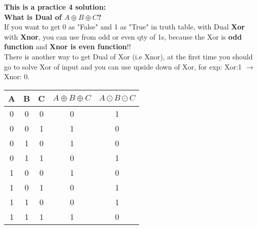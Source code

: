 \documentclass[12pt]{report}
\begin{document}
\LARGE \textbf{This is a practice 4 solution:}\\

\large \textbf{What is Dual of $A \oplus B \oplus C$?}\\

If you want to get 0 as "False" and 1 as "True" in truth table, with Dual \textbf{Xor} with \textbf{Xnor}, you can use from odd or even qty of 1s, because the Xor is \textbf{odd function} and \textbf{Xnor is even function}!!\\
There is another way to get Dual of Xor (i.e Xnor), at the first time you should go to solve Xor of input and you can use upside down of Xor, for exp: Xor:1 $\rightarrow$ Xnor: 0.

\begin{table}[ht]\centering
	\begin{tabular}{ c c c | c | c}
		A & B & C & $A \oplus B \oplus C$ & $A \odot B \odot C$\\
		\hline
		0 & 0 & 0 & 0 &1 \\ 				
		0 & 0 & 1 & 1 &0 \\
		0 & 1 & 0 & 1 &0 \\
		0 & 1 & 1 & 0 &1 \\
		1 & 0 & 0 & 1 &0 \\
		1 & 0 & 1 & 0 &1 \\
		1 & 1 & 0 & 0 &1 \\
		1 & 1 & 1 & 1 &0 \\
		
	\end{tabular}
\end{table}
\end{document}
